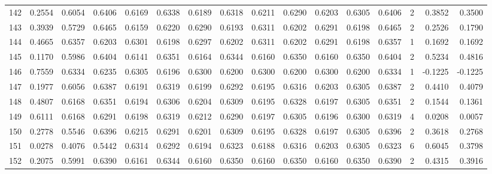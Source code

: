 \begin{tabular}{lrrrrrrrrrrrrrrr}
142 &      0.2554 &  0.6054 &  0.6406 &  0.6169 &  0.6338 &  0.6189 &  0.6318 &  0.6211 &  0.6290 &  0.6203 &   0.6305 &     0.6406 &      2 &                    0.3852 &                     0.3500 \\
143 &      0.3939 &  0.5729 &  0.6465 &  0.6159 &  0.6220 &  0.6290 &  0.6193 &  0.6311 &  0.6202 &  0.6291 &   0.6198 &     0.6465 &      2 &                    0.2526 &                     0.1790 \\
144 &      0.4665 &  0.6357 &  0.6203 &  0.6301 &  0.6198 &  0.6297 &  0.6202 &  0.6311 &  0.6202 &  0.6291 &   0.6198 &     0.6357 &      1 &                    0.1692 &                     0.1692 \\
145 &      0.1170 &  0.5986 &  0.6404 &  0.6141 &  0.6351 &  0.6164 &  0.6344 &  0.6160 &  0.6350 &  0.6160 &   0.6350 &     0.6404 &      2 &                    0.5234 &                     0.4816 \\
146 &      0.7559 &  0.6334 &  0.6235 &  0.6305 &  0.6196 &  0.6300 &  0.6200 &  0.6300 &  0.6200 &  0.6300 &   0.6200 &     0.6334 &      1 &                   -0.1225 &                    -0.1225 \\
147 &      0.1977 &  0.6056 &  0.6387 &  0.6191 &  0.6319 &  0.6199 &  0.6292 &  0.6195 &  0.6316 &  0.6203 &   0.6305 &     0.6387 &      2 &                    0.4410 &                     0.4079 \\
148 &      0.4807 &  0.6168 &  0.6351 &  0.6194 &  0.6306 &  0.6204 &  0.6309 &  0.6195 &  0.6328 &  0.6197 &   0.6305 &     0.6351 &      2 &                    0.1544 &                     0.1361 \\
149 &      0.6111 &  0.6168 &  0.6291 &  0.6198 &  0.6319 &  0.6212 &  0.6290 &  0.6197 &  0.6305 &  0.6196 &   0.6300 &     0.6319 &      4 &                    0.0208 &                     0.0057 \\
150 &      0.2778 &  0.5546 &  0.6396 &  0.6215 &  0.6291 &  0.6201 &  0.6309 &  0.6195 &  0.6328 &  0.6197 &   0.6305 &     0.6396 &      2 &                    0.3618 &                     0.2768 \\
151 &      0.0278 &  0.4076 &  0.5442 &  0.6314 &  0.6292 &  0.6194 &  0.6323 &  0.6188 &  0.6316 &  0.6203 &   0.6305 &     0.6323 &      6 &                    0.6045 &                     0.3798 \\
152 &      0.2075 &  0.5991 &  0.6390 &  0.6161 &  0.6344 &  0.6160 &  0.6350 &  0.6160 &  0.6350 &  0.6160 &   0.6350 &     0.6390 &      2 &                    0.4315 &                     0.3916 \\

\end{tabular}
